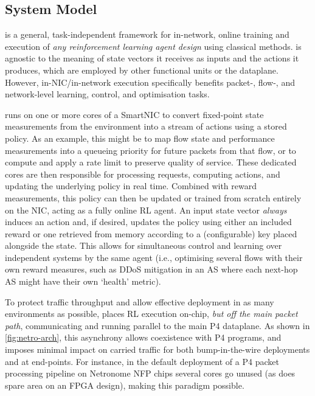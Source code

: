\subsection{System Model}
\approachshort{} is a general, task-independent framework for in-network, online training and execution of \emph{any reinforcement learning agent design} using classical methods.
\approachshort{} is agnostic to the meaning of state vectors it receives as inputs and the actions it produces, which are employed by other functional units or the dataplane.
However, in-NIC/in-network execution specifically benefits packet-, flow-, and network-level learning, control, and optimisation tasks.

\approachshort{} runs on one or more cores of a SmartNIC to convert fixed-point state measurements from the environment into a stream of actions using a stored policy.
As an example, this might be to map flow state and performance measurements into a queueing priority for future packets from that flow, or to compute and apply a rate limit to preserve quality of service.
These dedicated cores are then responsible for processing requests, computing actions, and updating the underlying policy in real time.
Combined with reward measurements, this policy can then be updated or trained from scratch entirely on the NIC, acting as a fully online RL agent.
An input state vector \emph{always} induces an action and, if desired, updates the policy using either an included reward or one retrieved from memory according to a (configurable) key placed alongside the state.
This allows for simultaneous control and learning over independent systems by the same agent (i.e., optimising several flows with their own reward measures, such as DDoS mitigation in an AS where each next-hop AS might have their own `health' metric).


To protect traffic throughput and allow effective deployment in as many environments as possible, \approachshort{} places RL execution on-chip, \emph{but off the main packet path}, communicating and running parallel to the main P4 dataplane.
As shown in \cref{fig:netro-arch}, this asynchrony allows coexistence with P4 programs, and imposes minimal impact on carried traffic for both bump-in-the-wire deployments and at end-points.
For instance, in the default deployment of a P4 packet processing pipeline on Netronome NFP chips several cores go unused (as does spare area on an FPGA design), making this paradigm possible.

